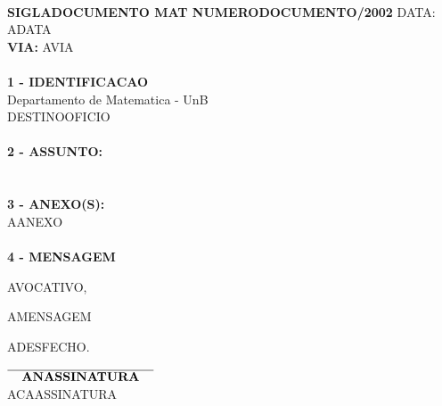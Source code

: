 

\vspace*{2mm}
\hspace*{1mm} 
\timbrado
\parindent=2cm 
\setlength{\baselineskip}{5mm}
\noindent 
\vspace*{1cm} \\
\begin{minipage}{17cm}
\vspace*{-8mm}
\parindent=2cm
\setlength{\baselineskip}{5mm}
\vspace*{-8mm}
\noindent
\small
{\bf  SIGLADOCUMENTO MAT NUMERODOCUMENTO/2002} \hfill {DATA:} {ADATA}
\vum \\
{\bf VIA:} {AVIA}  
\\
\mbox{} \hrulefill\
\\
{\bf 1 - IDENTIFICACAO} 
\\
\phantom{xxx}{\bf Procedencia:} {Departamento de Matematica - UnB}
\\
 {DESTINOOFICIO}
\\
\mbox{} \hrulefill\
\\
{\bf 2 - ASSUNTO:} \\
\phantom{xxx}{AASSUNTO}
\\
\mbox{} \hrulefill\
\\
{\bf 3 - ANEXO(S):} 
\\
\phantom{xxx} {AANEXO}
\\
\mbox{} \hrulefill\
\\
{ \bf 4 - MENSAGEM} 
\end{minipage}
\setlength{\baselineskip}{6mm}
\vspace*{8mm} 

AVOCATIVO,
\vspace*{8mm}

AMENSAGEM

ADESFECHO. 
\vspace*{1.5cm} \\
\hspace*{5.5cm} 
\begin{minipage}{10cm}
\setlength{\baselineskip}{4mm}
\begin{center} 
$\overline{\phantom{xx}\mbox{\bf  ANASSINATURA}
\phantom{xx}}$ 
\\
ACAASSINATURA 
\end{center}
\end{minipage}

